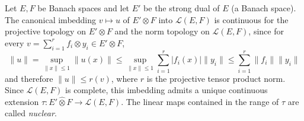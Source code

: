 Let $E, F$ be Banach spaces and let $E'$ be the strong dual of $E$ (a Banach space). The canonical imbedding $v \mapsto u$ of $E' \otimes F$ into $\mathcal{L}(E, F)$ is continuous for the projective topology on $E' \otimes F$ and the norm topology on $\mathcal{L}(E, F)$, since for every $v = \sum_{i=1}^r f_i \otimes y_i \in E' \otimes F$,
$$
\|u\| = \sup_{\|x\| \leq 1} \|u(x)\| \leq \sup_{\|x\| \leq 1} \sum_{i=1}^r |f_i(x)| \|y_i\| \leq \sum_{i=1}^r \|f_i\| \|y_i\|
$$
and therefore $\|u\| \leq r(v)$, where $r$ is the projective tensor product norm. Since $\mathcal{L}(E, F)$ is complete, this imbedding admits a unique continuous extension $\tau: E' \hat{\otimes} F \to \mathcal{L}(E, F)$. The linear maps contained in the range of $\tau$ are called \emph{nuclear}.
